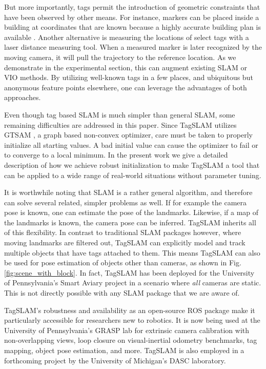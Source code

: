 But more importantly, tags permit the introduction of geometric
constraints that have been observed by other means. For instance, markers
can be placed inside a building at coordinates that are known because
a highly accurate building plan is available
\cite{pfrommer2017}. Another alternative is measuring the locations
of select tags with a laser distance measuring tool. When a measured
marker is later recognized by the moving camera, it will pull the
trajectory to the reference location. As we demonstrate in the
experimental section, this can augment existing SLAM or
VIO methods. By utilizing well-known tags in a few places, and
ubiquitous but anonymous feature points elsewhere, one can leverage
the advantages of both approaches.

Even though tag based SLAM is much simpler than general SLAM, some
remaining difficulties are addressed in this paper. Since TagSLAM
utilizes GTSAM  \cite{kaess2011}, a graph based non-convex optimizer, care must be taken
to properly initialize all starting values. A bad initial value can
cause the optimizer to fail or to converge to a local minimum. In the
present work we give a detailed description of how we achieve robust
initialization to make TagSLAM a tool that can be applied to a wide range of
real-world situations without parameter tuning.

It is worthwhile noting that SLAM is a rather general algorithm, and
therefore can solve several related, simpler problems as well. If for
example the camera pose is known, one can estimate the pose of the
landmarks. Likewise, if a map of the landmarks is known, the camera
pose can be inferred. TagSLAM inherits all of this flexibility. In
contrast to traditional SLAM packages however, where moving landmarks
are filtered out, TagSLAM can explicitly model and track multiple
objects that have tags attached to them. This means TagSLAM can also
be used for pose estimation of objects other than cameras, as shown in
Fig. \ref{fig:scene_with_block}. In fact, TagSLAM has been deployed for
the University of Pennsylvania's Smart Aviary project in a scenario
where {\em all} cameras are static. This is not directly possible with any SLAM
package that we are aware of.

TagSLAM's robustness and
availability as an open-source ROS \cite{quigley2009} package make it
particularly accessible for researchers new to robotics. It is now
being used at the University of Pennsylvania's GRASP lab for extrinsic camera calibration with
non-overlapping views, loop closure on visual-inertial odometry
benchmarks, tag mapping, object pose estimation, and more. TagSLAM is
also employed in a forthcoming project by the University of Michigan's
DASC laboratory.
